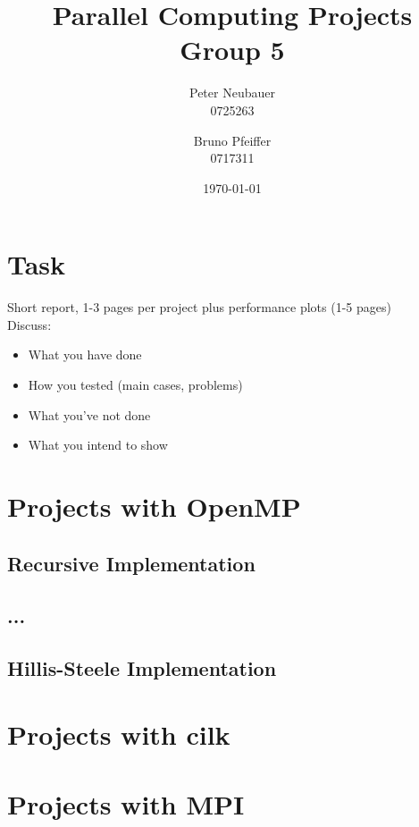 \documentclass[11pt, draft]{article}
\begin{document}
\title{Parallel Computing Projects\\ Group 5}
\author{Peter Neubauer\\ 0725263 \and Bruno Pfeiffer \\ 0717311}
\date{\today}
\maketitle
\newpage
\tableofcontents

\section{Task}
Short report, 1-3 pages per project plus performance plots (1-5 pages)\\
Discuss:
\begin{itemize}
\item What you have done
\item How you tested (main cases, problems)
\item What you've not done
\item What you intend to show
\end{itemize}


\section[OpenMP]{Projects with OpenMP}

\subsection{Recursive Implementation}

\subsection{...}

\subsection{Hillis-Steele Implementation}

\section[cilk]{Projects with cilk}

\section[MPI]{Projects with MPI}
\end{document}
